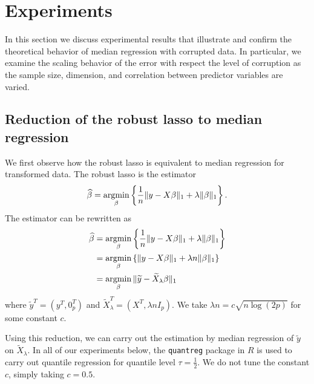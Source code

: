 
\section{Experiments}
\label{sec:experiments}

In this section we discuss experimental results that illustrate and confirm the theoretical behavior of
median regression with corrupted data. In particular, we examine the scaling behavior of the error
with respect the level of corruption as the sample size, dimension, and correlation between predictor variables
are varied.

\subsection{Reduction of the robust lasso to median regression}

We first observe how the robust lasso is equivalent to median regression for transformed data. The robust lasso is the  estimator
\begin{align*}
  \hat\beta = \argmin_\beta \left\{ \frac{1}{n}\|y - X\beta\|_1 + \lambda \|\beta\|_1\right\}.
\end{align*}
The estimator can be rewritten as
\begin{align*}
  \hat\beta &= \argmin_\beta \left\{ \frac{1}{n}\|y - X\beta\|_1 + \lambda \|\beta\|_1 \right\} \\
  &= \argmin_\beta \left\{ \|y - X\beta\|_1 + \lambda n \|\beta\|_1 \right\} \\
  &= \argmin_\beta \|\tilde y - \tilde X_\lambda \beta\|_1
\end{align*}
where $\tilde y^T = (y^T, 0_p^T)$  and $\tilde X_\lambda^T = (X^T, \lambda n I_p)$.
We take $\lambda n = c\sqrt{n \log (2p)}$ for some constant $c$.

Using this reduction, we can carry out the estimation by
median regression of $\tilde y$ on $\tilde X_\lambda$. In all of our experiments below, the \texttt{quantreg} package in $R$ is used to carry out quantile regression for quantile level $\tau = \frac{1}{2}$. We do not tune the constant $c$, simply taking $c=0.5$.
